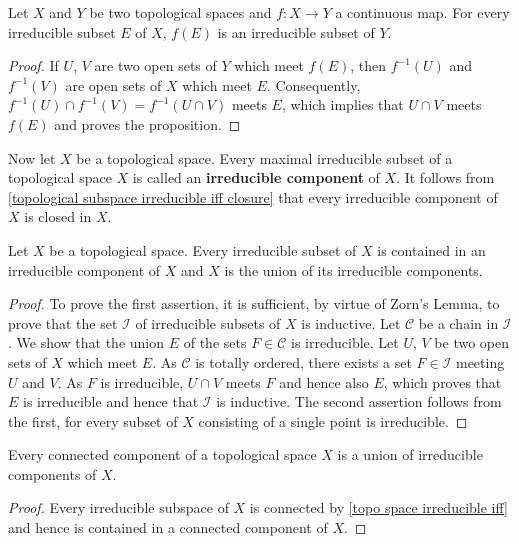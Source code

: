 \begin{proposition}\label{topo space irreducible under continuous map}
Let $X$ and $Y$ be two topological spaces and $f:X\to Y$ a continuous map. For every irreducible subset $E$ of $X$, $f(E)$ is an irreducible subset of $Y$.
\end{proposition}
\begin{proof}
If $U$, $V$ are two open sets of $Y$ which meet $f(E)$, then $f^{-1}(U)$ and $f^{-1}(V)$ are open sets of $X$ which meet $E$. Consequently, $f^{-1}(U)\cap f^{-1}(V)=f^{-1}(U\cap V)$ meets $E$, which implies that $U\cap V$ meets $f(E)$ and proves the proposition.
\end{proof}
Now let $X$ be a topological space. Every maximal irreducible subset of a topological space $X$ is called an \textbf{irreducible component} of $X$. It follows from \cref{topological subspace irreducible iff closure} that every irreducible component of $X$ is closed in $X$.
\begin{proposition}\label{topo space irreducible component prop}
Let $X$ be a topological space. Every irreducible subset of $X$ is contained in an irreducible component of $X$ and $X$ is the union of its irreducible components.
\end{proposition}
\begin{proof}
To prove the first assertion, it is sufficient, by virtue of Zorn's Lemma, to prove that the set $\mathcal{I}$ of irreducible subsets of $X$ is inductive. Let $\mathcal{C}$ be a chain in $\mathcal{I}$. We show that the union $E$ of the sets $F\in\mathcal{C}$ is irreducible. Let $U$, $V$ be two open sets of $X$ which meet $E$. As $\mathcal{C}$ is totally ordered, there exists a set $F\in\mathcal{I}$ meeting $U$ and $V$. As $F$ is irreducible, $U\cap V$ meets $F$ and hence also $E$, which proves that $E$ is irreducible and hence that $\mathcal{I}$ is inductive. The second assertion follows from the first, for every subset of $X$ consisting of a single point is irreducible.
\end{proof}
\begin{corollary}\label{topo space connected component union of irre component}
Every connected component of a topological space $X$ is a union of irreducible components of $X$.
\end{corollary}
\begin{proof}
Every irreducible subspace of $X$ is connected by \cref{topo space irreducible iff} and hence is contained in a connected component of $X$.
\end{proof}
